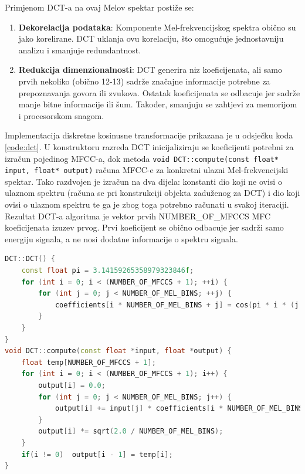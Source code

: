 Primjenom DCT-a na ovaj Melov spektar postiže se:

\begin{enumerate}
\item \textbf{Dekorelacija podataka}: Komponente Mel-frekvencijskog spektra obično su jako 
korelirane. DCT uklanja ovu korelaciju, što omogućuje jednostavniju analizu i smanjuje
redundantnost.

\item \textbf{Redukcija dimenzionalnosti}: DCT generira niz koeficijenata, ali samo prvih
nekoliko (obično 12-13) sadrže značajne informacije potrebne za prepoznavanja govora ili zvukova. 
Ostatak koeficijenata se odbacuje jer sadrže manje bitne informacije ili šum. Također,
smanjuju se zahtjevi za memorijom i procesorskom snagom.
\end{enumerate}

Implementacija diskretne kosinusne transformacije prikazana je u odsječku koda \ref{code:dct}.
U konstruktoru razreda DCT inicijaliziraju se koeficijenti potrebni za izračun pojedinog MFCC-a,
dok metoda \texttt{void DCT::compute(const float* input, float* output)} 
računa MFCC-e za konkretni ulazni Mel-frekvencijski spektar. Tako
razdvojen je izračun na dva dijela: konstanti dio koji ne ovisi o ulaznom spektru (računa
se pri konstrukciji objekta zaduženog za DCT) i dio koji
ovisi o ulaznom spektru te ga je zbog toga potrebno računati u svakoj iteraciji.
Rezultat DCT-a algoritma je vektor prvih NUMBER\_OF\_MFCCS MFC koeficijenata izuzev
prvog. Prvi koeficijent se obično odbacuje jer sadrži samo energiju signala, a ne nosi
dodatne informacije o spektru signala.

\begin{lstlisting}[language=C++, caption=FFT, label=code:dct]
DCT::DCT() {
    const float pi = 3.14159265358979323846f;
    for (int i = 0; i < (NUMBER_OF_MFCCS + 1); ++i) {
        for (int j = 0; j < NUMBER_OF_MEL_BINS; ++j) {
            coefficients[i * NUMBER_OF_MEL_BINS + j] = cos(pi * i * (j + 0.5f) / NUMBER_OF_MEL_BINS);
        }
    }
}
void DCT::compute(const float *input, float *output) {
    float temp[NUMBER_OF_MFCCS + 1];
    for (int i = 0; i < (NUMBER_OF_MFCCS + 1); i++) {
        output[i] = 0.0;
        for (int j = 0; j < NUMBER_OF_MEL_BINS; j++) {
            output[i] += input[j] * coefficients[i * NUMBER_OF_MEL_BINS + j];
        }
        output[i] *= sqrt(2.0 / NUMBER_OF_MEL_BINS);
    }
    if(i != 0)  output[i - 1] = temp[i];
}
\end{lstlisting}

